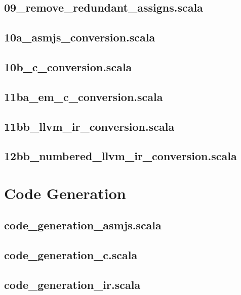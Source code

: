 \documentclass{article}
\begin{document}
    \subsection{09\_remove\_redundant\_assigns.scala}
    
    \newpage
    \subsection{10a\_asmjs\_conversion.scala}
    
    \newpage
    \subsection{10b\_c\_conversion.scala}
    
    \newpage
    \subsection{11ba\_em\_c\_conversion.scala}
    
    \newpage
    \subsection{11bb\_llvm\_ir\_conversion.scala}
    
    \newpage
    \subsection{12bb\_numbered\_llvm\_ir\_conversion.scala}
    
    \newpage

    \section{Code Generation}
    \subsection{code\_generation\_asmjs.scala}
    
    \newpage
    \subsection{code\_generation\_c.scala}
    
    \newpage
    \subsection{code\_generation\_ir.scala}
    
    \newpage
\end{document}
